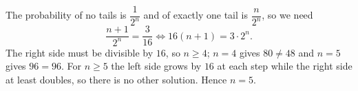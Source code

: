 The probability of no tails is $\dfrac{1}{2^n}$ and of exactly one tail is $\dfrac{n}{2^n}$, so we need
\[
\dfrac{n+1}{2^n}=\dfrac{3}{16}\iff 16(n+1)=3\cdot2^n .
\]
The right side must be divisible by $16$, so $n\ge4$; $n=4$ gives $80\ne48$ and $n=5$ gives $96=96$. For $n\ge5$ the left side grows by $16$ at each step while the right side at least doubles, so there is no other solution. Hence $n=\boxed{5}$.
